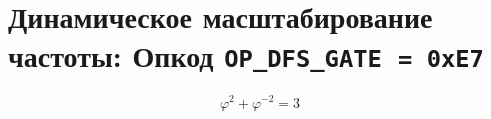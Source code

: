 %

\theoremstyle{plain}
\newtheorem{theorem}{Теорема}[chapter]
\newtheorem{lemma}[theorem]{Лемма}
\newtheorem{corollary}[theorem]{Следствие}
\newtheorem{definition}{Определение}[chapter]
\newtheorem{remark}{Замечание}[chapter]
\newtheorem{proposition}[theorem]{Утверждение}

\chapter{Динамическое масштабирование частоты: Опкод
  \texttt{OP\_DFS\_GATE}~\texttt{=~0xE7}}%
\label{ch:glava86-dfs}

%
\[
  \varphi^{2} + \varphi^{-2} = 3
\]

